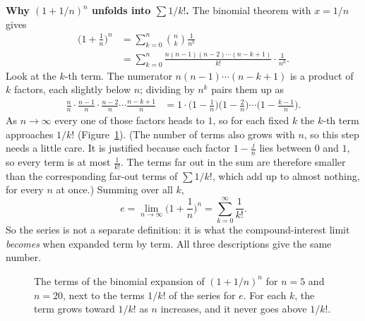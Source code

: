 \begin{whybox}
\textbf{Why $(1+1/n)^n$ unfolds into $\sum 1/k!$.} The binomial theorem with $x=1/n$ gives
\begin{align*}
\Big(1+\frac1n\Big)^{n}
  &= \sum_{k=0}^{n}\binom{n}{k}\frac{1}{n^{k}}\\
  &= \sum_{k=0}^{n}\frac{n(n-1)(n-2)\cdots(n-k+1)}{k!}\cdot\frac{1}{n^{k}}.
\end{align*}
Look at the $k$-th term. The numerator $n(n-1)\cdots(n-k+1)$ is a product of $k$ factors, each slightly below $n$; dividing by $n^{k}$ pairs them up as
\begin{align*}
\frac{n}{n}\cdot\frac{n-1}{n}\cdot\frac{n-2}{n}\cdots\frac{n-k+1}{n}
  &= 1\cdot\Big(1-\frac1n\Big)\Big(1-\frac2n\Big)\cdots\Big(1-\frac{k-1}{n}\Big).
\end{align*}
As $n\to\infty$ every one of those factors heads to $1$, so for each fixed $k$ the $k$-th term approaches $1/k!$ (Figure~\ref{ch03:fig-binomial-terms}). (The number of terms also grows with $n$, so this step needs a little care. It is justified because each factor $1 - \frac{j}{n}$ lies between $0$ and $1$, so every term is at most $\frac{1}{k!}$. The terms far out in the sum are therefore smaller than the corresponding far-out terms of $\sum 1/k!$, which add up to almost nothing, for every $n$ at once.) Summing over all $k$,
\[
e=\lim_{n\to\infty}\Big(1+\frac1n\Big)^n = \sum_{k=0}^{\infty}\frac{1}{k!}.
\]
So the series is not a separate definition: it is what the compound-interest limit \emph{becomes} when expanded term by term. All three descriptions give the same number.
\end{whybox}

\begin{figure}[htbp]
\centering
{}
\caption{The terms of the binomial expansion of $(1+1/n)^n$ for $n=5$ and $n=20$, next to the terms $1/k!$ of the series for $e$. For each $k$, the term grows toward $1/k!$ as $n$ increases, and it never goes above $1/k!$.}
\label{ch03:fig-binomial-terms}
\end{figure}

